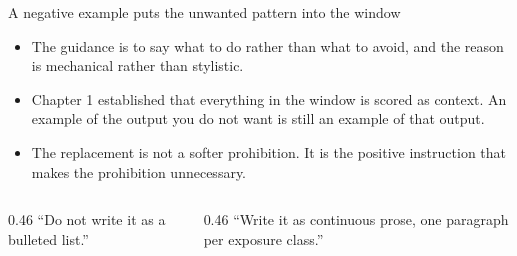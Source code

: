 \documentclass[aspectratio=169,11pt]{beamer}
\newcommand{\standing}[1]{\par\vspace{0.25em}{\footnotesize\color{uhslate}\textbf{Standing:} #1}}
\begin{document}
\begin{frame}{A negative example puts the unwanted pattern into the window}
  \begin{itemize}\small
    \item The guidance is to say what to do rather than what to avoid, and the reason is
          mechanical rather than stylistic.
    \item Chapter 1 established that everything in the window is scored as context. An
          example of the output you do not want is still an example of that output.
    \item The replacement is not a softer prohibition. It is the positive instruction that
          makes the prohibition unnecessary.
  \end{itemize}
  \vspace{0.3em}
  \begin{columns}[T]
    \begin{column}{0.46\textwidth}
      {\footnotesize\color{uhred}``Do not write it as a bulleted list.''}
    \end{column}
    \begin{column}{0.46\textwidth}
      {\footnotesize\color{uhteal}``Write it as continuous prose, one paragraph per exposure
       class.''}
    \end{column}
  \end{columns}
  \standing{documented.}
\end{frame}
\end{document}
